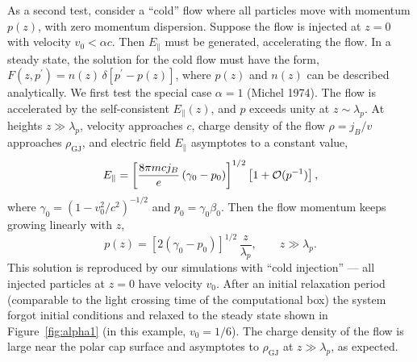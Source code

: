 As a second test, consider a ``cold'' flow where all particles move with
momentum $p(z)$, with zero momentum dispersion. Suppose the flow is injected
at $z=0$ with velocity $v_0<\alpha c$. Then $E_\parallel$ must be generated,
accelerating the flow. In a steady state, the solution for the cold flow must have
the form, $F(z,p^\prime)=n(z)\,\delta[p^\prime-p(z)]$, where $p(z)$ and $n(z)$ can
be described analytically. We first test the special case $\alpha=1$
   (Michel 1974).
The flow is accelerated by the self-consistent $E_\parallel(z)$, and $p$ exceeds
unity at $z\sim\lambda_p$. At heights $z\gg \lambda_p$, velocity approaches $c$,
charge density of the flow $\rho=j_B/v$ approaches $\rho_\mathrm{GJ}$, and
electric field $E_\parallel$ asymptotes to a constant value,
\begin{equation}
   E_\parallel=\left[\frac{8\pi m cj_B}{e}\left(\gamma_0-p_0\right)\right]^{1/2}
                      \left[1+{\cal O}(p^{-1})\right],
\end{equation}
where $\gamma_0=(1-v_0^2/c^2)^{-1/2}$ and $p_0=\gamma_0\beta_0$.
Then the flow momentum keeps growing linearly with $z$,
\begin{equation}
     p(z)=\left[2(\gamma_0-p_0)\right]^{1/2}\,\frac{z}{\lambda_p}, \qquad z\gg\lambda_p.
\end{equation}
This solution is reproduced by our simulations with ``cold injection'' --- all injected
particles at $z=0$ have velocity $v_0$. After an initial relaxation period
(comparable to the light crossing time of the computational box) the system
forgot initial conditions and relaxed to the steady state shown in Figure~\ref{fig:alpha1}
(in this example, $v_0=1/6$).
The charge density of the flow is large near the polar cap surface and asymptotes
to $\rho_\mathrm{GJ}$ at $z\gg\lambda_p$, as expected.

\bigskip

